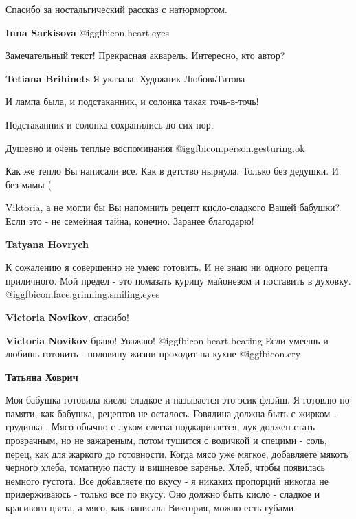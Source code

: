 \begin{itemize}
Спасибо за ностальгический рассказ с натюрмортом.

\textbf{Inna Sarkisova}  @igg{fbicon.heart.eyes} 

Замечательный текст! Прекрасная акварель. Интересно, кто автор?

\textbf{Tetiana Brihinets} Я указала.
Художник ЛюбовьТитова

И лампа была, и подстаканник, и солонка такая точь-в-точь!

Подстаканник и солонка сохранились до сих пор.

Душевно и очень теплые воспоминания @igg{fbicon.person.gesturing.ok} 

Как же тепло Вы написали все. Как в детство нырнула. Только без дедушки. И без мамы (


Viktoria, а не могли бы Вы напомнить рецепт кисло-сладкого Вашей бабушки? Если
это - не семейная тайна, конечно. Заранее благодарю!

\begin{itemize} %
\textbf{Tatyana Hovrych} 

К сожалению я совершенно не умею готовить. И не знаю ни одного
рецепта приличного. Мой предел - это помазать курицу майонезом
и поставить в духовку.  @igg{fbicon.face.grinning.smiling.eyes} 

\begin{itemize} %

\textbf{Victoria Novikov}, спасибо!

\textbf{Victoria Novikov} браво! Уважаю! @igg{fbicon.heart.beating} Если умеешь и любишь готовить - половину жизни проходит на кухне @igg{fbicon.cry} 
\end{itemize} %

\textbf{Татьяна Ховрич}

Моя бабушка готовила кисло-сладкое и называется это эсик флэйш. Я готовлю по
памяти, как бабушка, рецептов не осталось. Говядина должна быть с жирком -
грудинка . Мясо обычно с луком слегка поджаривается, лук должен стать
прозрачным, но не зажареным, потом тушится с водичкой и специми - соль, перец,
как для жаркого до готовности. Когда мясо уже мягкое, добавляете мякоть черного
хлеба, томатную пасту и вишневое варенье. Хлеб, чтобы появилась немного
густота. Всё добавляете по вкусу - я никаких пропорций никогда не придерживаюсь
- только все по вкусу. Оно должно быть кисло - сладкое и красивого цвета, а
мясо, как написала Виктория, можно есть губами


\end{itemize}
\end{itemize}
